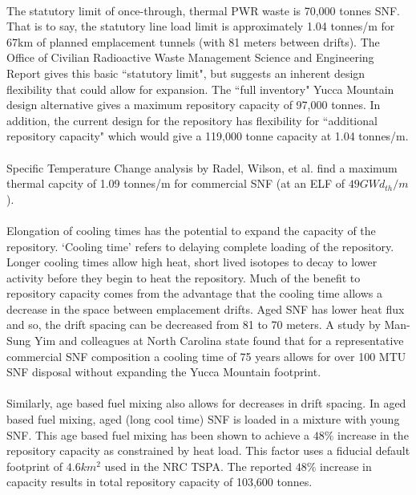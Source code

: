 \paragraph{}
The statutory limit of once-through, thermal PWR waste is 70,000 tonnes SNF. That is to say, the 
statutory line load limit is approximately 1.04 tonnes/m for 67km of planned emplacement tunnels 
(with 81 meters between drifts). The Office of Civilian Radioactive Waste Management Science and 
Engineering Report gives this basic ``statutory limit", but suggests an inherent design flexibility 
that could allow for expansion. The ``full inventory" Yucca Mountain design alternative gives a 
maximum repository capacity of 97,000 tonnes. In addition, the current design for the repository has 
flexibility for ``additional repository capacity" which would give a 119,000 tonne capacity at 1.04 
tonnes/m.\cite{OCRWMSciEng} \paragraph{}
Specific Temperature Change analysis by Radel, Wilson, et al. find a maximum thermal capcity of 1.09 
tonnes/m for commercial SNF (at an ELF of $49 GWd_{th}/m$).\cite{radel_effect_2007} \paragraph{}
Elongation of cooling times has the potential to expand the capacity of the repository. `Cooling 
time' refers to delaying complete loading of the repository. Longer cooling times allow high heat, 
short lived isotopes to decay to lower activity before they begin to heat the repository. Much of 
the benefit to repository capacity comes from the advantage that the cooling time allows a decrease 
in the space between emplacement drifts. Aged SNF has lower heat flux and so, the drift spacing can 
be decreased from 81 to 70 meters. A study by Man-Sung Yim and colleagues at North Carolina state 
found that for a representative commercial SNF composition a cooling time of 75 years allows for 
over 100 MTU SNF disposal without expanding the Yucca Mountain footprint.\cite{li_examining_2007}
\paragraph{}
Similarly, age based fuel mixing also allows for decreases in drift spacing. In aged based fuel 
mixing, aged (long cool time) SNF is loaded in a mixture with young SNF. This age based fuel mixing 
has been shown to achieve a $48\%$ increase in the repository capacity as constrained by heat 
load.\cite{nicholson_thermal_2007} This factor uses a fiducial default footprint of $4.6 km^2$ used 
in the NRC TSPA. The reported $48\%$ increase in capacity results in total repository capacity of 
103,600 tonnes.\cite{williams_contract_2001}
